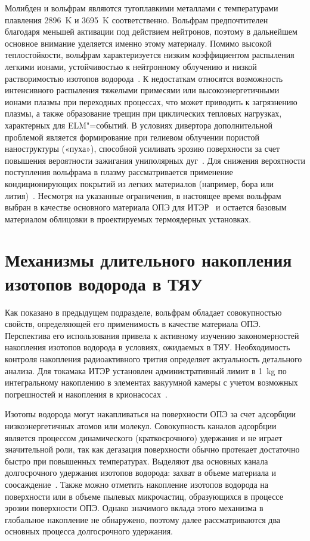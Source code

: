 Молибден и вольфрам являются тугоплавкими металлами с температурами плавления \SI{2896}{\kelvin} и \SI{3695}{\kelvin} соответственно. Вольфрам предпочтителен благодаря меньшей активации под действием нейтронов, поэтому в дальнейшем основное внимание уделяется именно этому материалу. Помимо высокой теплостойкости, вольфрам характеризуется низким коэффициентом распыления легкими ионами, устойчивостью к нейтронному облучению и низкой растворимостью изотопов водорода~\cite{Roth2011,Pintsuk2012,Rieth2019}. К недостаткам относятся возможность интенсивного распыления тяжелыми примесями или высокоэнергетичными ионами плазмы при переходных процессах, что может приводить к загрязнению плазмы, а также образование трещин при циклических тепловых нагрузках, характерных для ELM"=событий. В условиях дивертора дополнительной проблемой является формирование при гелиевом облучении пористой наноструктуры («пуха»), способной усиливать эрозию поверхности за счет повышения вероятности зажигания униполярных дуг~\cite{Ueda2018,Kajita2018,Fedorovich2019}. Для снижения вероятности поступления вольфрама в плазму рассматривается применение кондиционирующих покрытий из легких материалов (например, бора или лития)~\cite{Wauters2020}. Несмотря на указанные ограничения, в настоящее время вольфрам выбран в качестве основного материала ОПЭ для ИТЭР~\cite{Pitts2025} и остается базовым материалом облицовки в проектируемых термоядерных установках.

\section{Механизмы длительного накопления изотопов водорода в ТЯУ}\label{sec:ch1/sec3}
Как показано в предыдущем подразделе, вольфрам обладает совокупностью свойств, определяющей его применимость в качестве материала ОПЭ. Перспектива его использования привела к активному изучению закономерностей накопления изотопов водорода в условиях, ожидаемых в ТЯУ. Необходимость контроля накопления радиоактивного трития определяет актуальность детального анализа. Для токамака ИТЭР установлен административный лимит в \SI{1}{\kilogram} по интегральному накоплению в элементах вакуумной камеры с учетом возможных погрешностей и накопления в крионасосах~\cite{Roth1}.

Изотопы водорода могут накапливаться на поверхности ОПЭ за счет адсорбции низкоэнергетичных атомов или молекул. Совокупность каналов адсорбции является процессом динамического (краткосрочного) удержания и не играет значительной роли, так как дегазация поверхности обычно протекает достаточно быстро при повышенных температурах. Выделяют два основных канала долгосрочного удержания изотопов водорода: захват в объеме материала и соосаждение~\cite{Gasparyan2024, Skinner2009}. Также можно отметить накопление изотопов водорода на поверхности или в объеме пылевых микрочастиц, образующихся в процессе эрозии поверхности ОПЭ. Однако значимого вклада этого механизма в глобальное накопление не обнаружено, поэтому далее рассматриваются два основных процесса долгосрочного удержания.

